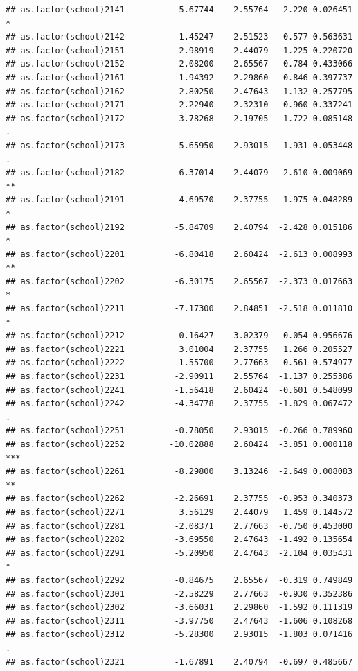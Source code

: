 \documentclass[ignorenonframetext,]{beamer}
\begin{document}
\begin{frame}[fragile]{}
\begin{verbatim}
## as.factor(school)2141          -5.67744    2.55764  -2.220 0.026451 *  
## as.factor(school)2142          -1.45247    2.51523  -0.577 0.563631    
## as.factor(school)2151          -2.98919    2.44079  -1.225 0.220720    
## as.factor(school)2152           2.08200    2.65567   0.784 0.433066    
## as.factor(school)2161           1.94392    2.29860   0.846 0.397737    
## as.factor(school)2162          -2.80250    2.47643  -1.132 0.257795    
## as.factor(school)2171           2.22940    2.32310   0.960 0.337241    
## as.factor(school)2172          -3.78268    2.19705  -1.722 0.085148 .  
## as.factor(school)2173           5.65950    2.93015   1.931 0.053448 .  
## as.factor(school)2182          -6.37014    2.44079  -2.610 0.009069 ** 
## as.factor(school)2191           4.69570    2.37755   1.975 0.048289 *  
## as.factor(school)2192          -5.84709    2.40794  -2.428 0.015186 *  
## as.factor(school)2201          -6.80418    2.60424  -2.613 0.008993 ** 
## as.factor(school)2202          -6.30175    2.65567  -2.373 0.017663 *  
## as.factor(school)2211          -7.17300    2.84851  -2.518 0.011810 *  
## as.factor(school)2212           0.16427    3.02379   0.054 0.956676    
## as.factor(school)2221           3.01004    2.37755   1.266 0.205527    
## as.factor(school)2222           1.55700    2.77663   0.561 0.574977    
## as.factor(school)2231          -2.90911    2.55764  -1.137 0.255386    
## as.factor(school)2241          -1.56418    2.60424  -0.601 0.548099    
## as.factor(school)2242          -4.34778    2.37755  -1.829 0.067472 .  
## as.factor(school)2251          -0.78050    2.93015  -0.266 0.789960    
## as.factor(school)2252         -10.02888    2.60424  -3.851 0.000118 ***
## as.factor(school)2261          -8.29800    3.13246  -2.649 0.008083 ** 
## as.factor(school)2262          -2.26691    2.37755  -0.953 0.340373    
## as.factor(school)2271           3.56129    2.44079   1.459 0.144572    
## as.factor(school)2281          -2.08371    2.77663  -0.750 0.453000    
## as.factor(school)2282          -3.69550    2.47643  -1.492 0.135654    
## as.factor(school)2291          -5.20950    2.47643  -2.104 0.035431 *  
## as.factor(school)2292          -0.84675    2.65567  -0.319 0.749849    
## as.factor(school)2301          -2.58229    2.77663  -0.930 0.352386    
## as.factor(school)2302          -3.66031    2.29860  -1.592 0.111319    
## as.factor(school)2311          -3.97750    2.47643  -1.606 0.108268    
## as.factor(school)2312          -5.28300    2.93015  -1.803 0.071416 .  
## as.factor(school)2321          -1.67891    2.40794  -0.697 0.485667    

\end{verbatim}
\end{frame}
\end{document}
